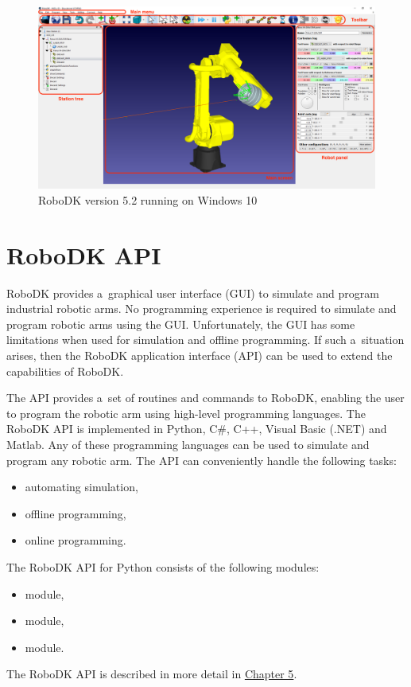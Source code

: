 \begin{figure}[h]
    \centering
    \includegraphics[width=0.9\linewidth]{img/robodk_interface_v_2.png}
    \caption{RoboDK version 5.2 running on Windows 10}
    \label{fig:robodkinterface}
\end{figure}

\section{RoboDK API}

RoboDK provides a~graphical user interface (GUI) to simulate and program industrial robotic arms. No programming experience is required to simulate and program robotic arms using the GUI. Unfortunately, the GUI has some limitations when used for simulation and offline programming. If such a~situation arises, then the RoboDK application interface (API) can be used to extend the capabilities of RoboDK.

The API provides a~set of routines and commands to RoboDK, enabling the user to program the robotic arm using high-level programming languages. The RoboDK API is implemented in Python, C\#, C++, Visual Basic (.NET) and Matlab. Any of these programming languages can be used to simulate and program any robotic arm. The API can conveniently handle the following tasks:

\begin{itemize}
    \item automating simulation,
    \item offline programming,
    \item online programming.

\end{itemize}
The RoboDK API for Python consists of the following modules:


\begin{itemize}
    \item {} module, 
    \item {} module, 
    \item {} module.
\end{itemize}
The RoboDK API is described in more detail in \hyperref[chap:implementation]{Chapter 5}.

